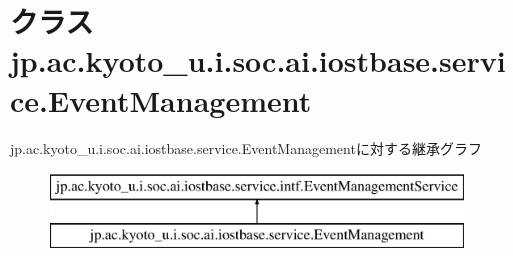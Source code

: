 \hypertarget{classjp_1_1ac_1_1kyoto__u_1_1i_1_1soc_1_1ai_1_1iostbase_1_1service_1_1_event_management}{\section{クラス jp.\-ac.\-kyoto\-\_\-u.\-i.\-soc.\-ai.\-iostbase.\-service.\-Event\-Management}
\label{classjp_1_1ac_1_1kyoto__u_1_1i_1_1soc_1_1ai_1_1iostbase_1_1service_1_1_event_management}
}
jp.\-ac.\-kyoto\-\_\-u.\-i.\-soc.\-ai.\-iostbase.\-service.\-Event\-Managementに対する継承グラフ\begin{figure}[H]
\begin{center}
\leavevmode
\includegraphics[height=2.000000cm]{classjp_1_1ac_1_1kyoto__u_1_1i_1_1soc_1_1ai_1_1iostbase_1_1service_1_1_event_management}
\end{center}
\end{figure}
